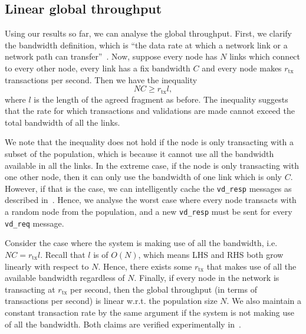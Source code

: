 \subsection{Linear global throughput}
\label{sec:global-throughput}
Using our results so far, we can analyse the global throughput.
First, we clarify the bandwidth definition, which is ``the data rate at which a network link or a network path can transfer''~\cite{prasad2003bandwidth}.
Now, suppose every node has $N$ links which connect to every other node,
every link has a fix bandwidth $C$ and every node makes $r_{\text{tx}}$ transactions per second.
Then we have the inequality
$$NC \ge r_{\text{tx}} l,$$
where $l$ is the length of the agreed fragment as before.
The inequality suggests that the rate for which transactions and validations are made cannot exceed the total bandwidth of all the links.

We note that the inequality does not hold if the node is only transacting with a subset of the population,
which is because it cannot use all the bandwidth available in all the links.
In the extreme case, if the node is only transacting with one other node, then it can only use the bandwidth of one link which is only $C$.
However, if that is the case, we can intelligently cache the \texttt{vd\_resp} messages as described in~.
Hence, we analyse the worst case where every node transacts with a random node from the population,
and a new \texttt{vd\_resp} must be sent for every \texttt{vd\_req} message.

Consider the case where the system is making use of all the bandwidth, i.e. $NC = r_{\text{tx}} l$.
Recall that $l$ is of $O(N)$, which means LHS and RHS both grow linearly with respect to $N$.
Hence, there exists some $r_\text{tx}$ that makes use of all the available bandwidth regardless of $N$.
Finally, if every node in the network is transacting at $r_{\text{tx}}$ per second,
then the global throughput (in terms of transactions per second) is linear w.r.t. the population size $N$.
We also maintain a constant transaction rate by the same argument if the system is not making use of all the bandwidth.
Both claims are verified experimentally in~.


